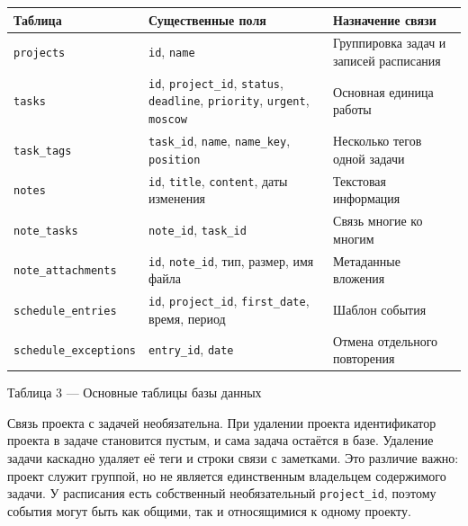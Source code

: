 \documentclass[14pt,a4paper]{extarticle}
\begin{document}
\begingroup\small
\begin{longtable}[]{@{}
  >{\raggedright\arraybackslash}p{}
  >{\raggedright\arraybackslash}p{}
  >{\raggedright\arraybackslash}p{}@{}}
\toprule\noalign{}
\begin{minipage}[b]{\linewidth}\raggedright
\textbf{Таблица}
\end{minipage} & \begin{minipage}[b]{\linewidth}\raggedright
\textbf{Существенные поля}
\end{minipage} & \begin{minipage}[b]{\linewidth}\raggedright
\textbf{Назначение связи}
\end{minipage} \\
\midrule\noalign{}
\endhead
\bottomrule\noalign{}
\endlastfoot
\texttt{projects} & \texttt{id}, \texttt{name} & Группировка задач и записей расписания \\
\texttt{tasks} & \texttt{id}, \texttt{project\_id}, \texttt{status}, \texttt{deadline}, \texttt{priority}, \texttt{urgent}, \texttt{moscow} & Основная единица работы \\
\texttt{task\_tags} & \texttt{task\_id}, \texttt{name}, \texttt{name\_key}, \texttt{position} & Несколько тегов одной задачи \\
\texttt{notes} & \texttt{id}, \texttt{title}, \texttt{content}, даты изменения & Текстовая информация \\
\texttt{note\_tasks} & \texttt{note\_id}, \texttt{task\_id} & Связь многие ко многим \\
\texttt{note\_attachments} & \texttt{id}, \texttt{note\_id}, тип, размер, имя файла & Метаданные вложения \\
\texttt{schedule\_entries} & \texttt{id}, \texttt{project\_id}, \texttt{first\_date}, время, период & Шаблон события \\
\texttt{schedule\_exceptions} & \texttt{entry\_id}, \texttt{date} & Отмена отдельного повторения \\
\end{longtable}
\endgroup

Таблица 3 --- Основные таблицы базы данных

Связь проекта с задачей необязательна. При удалении проекта идентификатор проекта в задаче становится пустым, и сама задача остаётся в базе. Удаление задачи каскадно удаляет её теги и строки связи с заметками. Это различие важно: проект служит группой, но не является единственным владельцем содержимого задачи. У расписания есть собственный необязательный \texttt{project\_id}, поэтому события могут быть как общими, так и относящимися к одному проекту.
\end{document}
